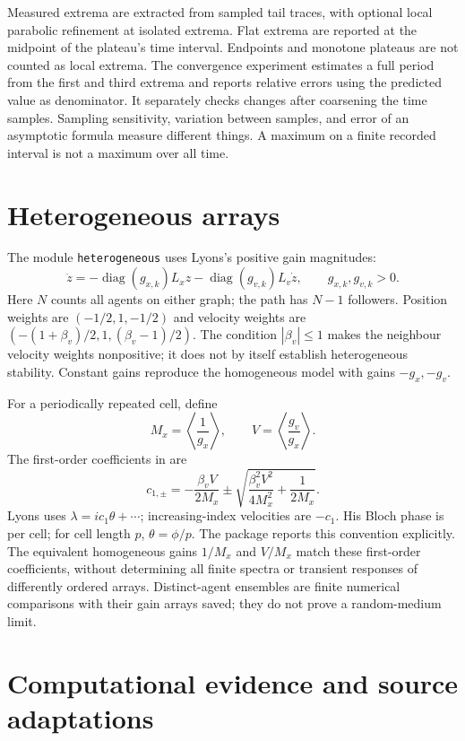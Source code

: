 \documentclass[11pt]{article}
\newcommand{\diag}{\mathop{\mathrm{diag}}}
\begin{document}
Measured extrema are extracted from sampled tail traces, with optional
local parabolic refinement at isolated extrema. Flat extrema are reported
at the midpoint of the plateau's time interval. Endpoints and monotone
plateaus are not counted as local extrema.
The convergence experiment estimates a full period from the first and third
extrema and reports relative errors using the predicted value as denominator.
It separately checks changes after coarsening the time samples.
Sampling sensitivity, variation between samples, and error of an asymptotic
formula measure different things.
A maximum on a finite recorded interval is not a maximum over all time.

\section{Heterogeneous arrays}

The module \texttt{heterogeneous} uses Lyons's positive gain magnitudes:
\begin{equation}\label{eq:heterogeneous}
 \ddot z=-\diag(g_{x,k})L_xz-\diag(g_{v,k})L_v\dot z,
 \qquad g_{x,k},g_{v,k}>0.
\end{equation}
Here $N$ counts all agents on either graph; the path has $N-1$ followers.
Position weights are $(-1/2,1,-1/2)$ and velocity weights are
$(-(1+\beta_v)/2,1,(\beta_v-1)/2)$.
The condition $|\beta_v|\leq1$ makes the neighbour velocity weights
nonpositive; it does not by itself establish heterogeneous stability.
Constant gains reproduce the homogeneous model with gains $-g_x,-g_v$.

For a periodically repeated cell, define
\[
 M_x=\left\langle\frac1{g_x}\right\rangle,\qquad
 V=\left\langle\frac{g_v}{g_x}\right\rangle.
\]
The first-order coefficients in \cite[Theorem 2.5.1]{lyons} are
\[
 c_{1,\pm}=-\frac{\beta_v V}{2M_x}
       \pm\sqrt{\frac{\beta_v^2V^2}{4M_x^2}+\frac1{2M_x}}.
\]
Lyons uses $\lambda=ic_1\theta+\cdots$; increasing-index velocities
are $-c_1$. His Bloch phase is per cell; for cell length $p$,
$\theta=\phi/p$. The package reports this convention explicitly.
The equivalent homogeneous gains $1/M_x$ and $V/M_x$ match these
first-order coefficients, without determining all finite spectra or
transient responses of differently ordered arrays.
Distinct-agent ensembles are finite numerical comparisons with their
gain arrays saved; they do not prove a random-medium limit.

\section{Computational evidence and source adaptations}
\end{document}
